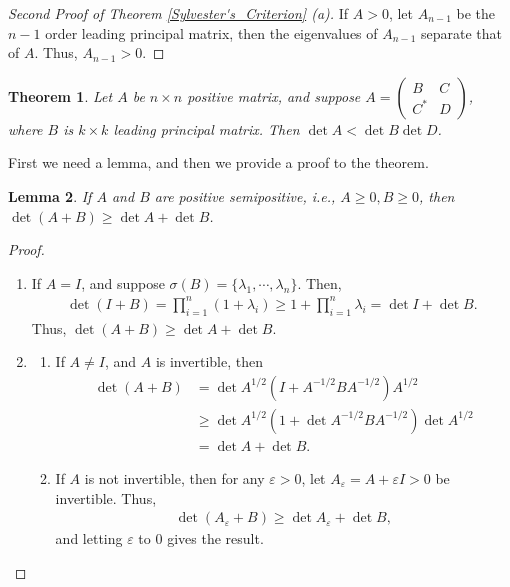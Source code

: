 \documentclass[11pt]{book}
\newtheorem{theorem}{Theorem}[section]
\newtheorem{lemma}[theorem]{Lemma}
\theoremstyle{definition}
\numberwithin{equation}{chapter}
\begin{document}
\begin{proof}[Second Proof of Theorem \ref{Sylvester's_Criterion} (a)]
If $A > 0$, let $A_{n-1}$ be the $n-1$ order leading principal matrix, then the eigenvalues of $A_{n-1}$ separate that of $A$. Thus, $A_{n-1} > 0$.
\end{proof}

\medskip

\begin{theorem}\label{block_matrix_inequality}
Let $A$ be $n \times n$ positive matrix, and suppose $A = \begin{pmatrix} B & C \\ C^* & D \end{pmatrix}$, where $B$ is $k \times k$ leading principal matrix. Then $\det A < \det B \det D$.
\end{theorem}

First we need a lemma, and then we provide a proof to the theorem.

\begin{lemma}
If $A$ and $B$ are positive semipositive, i.e., $A \geq 0, B \geq 0$, then $\det(A + B) \geq \det A + \det B$.
\end{lemma}
\begin{proof}
~\begin{enumerate}[label=(\alph*)]
    \item If $A = I$, and suppose $\sigma(B) = \{\lambda_1, \cdots, \lambda_n\}$. Then,
    \begin{align*}
        \det(I + B) = \prod^n_{i=1} (1 + \lambda_i) \geq 1 + \prod^n_{i=1} \lambda_i = \det I + \det B.
    \end{align*}
    Thus, $\det(A + B) \geq \det A + \det B$.
    
    \item 
    \begin{enumerate}[label=\arabic*)]
        \item If $A \neq I$, and $A$ is invertible, then
        \begin{align*}
            \det (A + B) & = \det A^{1/2} \left(I + A^{-1/2} B A^{-1/2}\right) A^{1/2} \\
            & \geq \det A^{1/2} \left(1 + \det A^{-1/2} B A^{-1/2} \right) \det A^{1/2} \\
            & = \det A + \det B.
        \end{align*}
        
        \item If $A$ is not invertible, then for any $\varepsilon > 0$, let $A_\varepsilon = A + \varepsilon I > 0$ be invertible. Thus, 
        \begin{align*}
            \det (A_\varepsilon + B) \geq \det A_\varepsilon + \det B,
        \end{align*}
        and letting $\varepsilon$ to $0$ gives the result.
    \end{enumerate}
\end{enumerate}
\end{proof}
\end{document}
